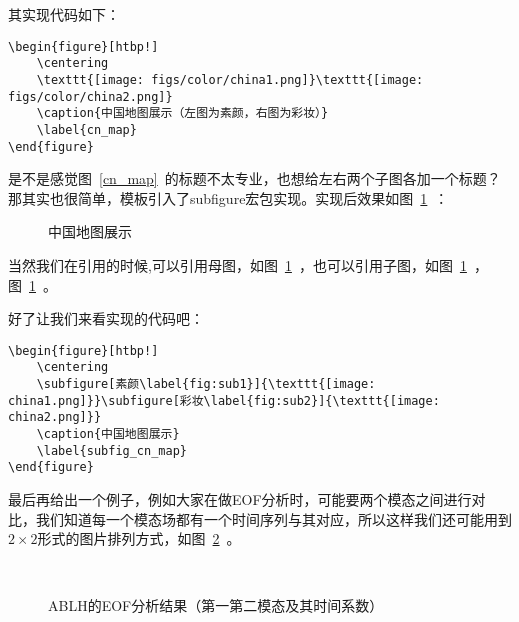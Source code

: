 其实现代码如下：

{
\color{green!50!black}
\begin{lstlisting}[breaklines=true,]
\begin{figure}[htbp!]
    \centering
    \texttt{[image: figs/color/china1.png]}\texttt{[image: figs/color/china2.png]}
    \caption{中国地图展示（左图为素颜，右图为彩妆）}
    \label{cn_map}
\end{figure}
\end{lstlisting}
}

是不是感觉图~\ref{cn_map}~的标题不太专业，也想给左右两个子图各加一个标题？那其实也很简单，模板引入了subfigure宏包实现。实现后效果如图~\ref{subfig_cn_map}~：

\begin{figure}[htbp!]
    \centering
    \caption{中国地图展示}
    \label{subfig_cn_map}
\end{figure}

当然我们在引用的时候,可以引用母图，如图~\ref{subfig_cn_map}~，也可以引用子图，如图~\ref{subfig_cn_map}~，图~\ref{subfig_cn_map}~。

好了让我们来看实现的代码吧：

{
\color{green!50!black}
\begin{lstlisting}[breaklines=true,]
\begin{figure}[htbp!]
    \centering
    \subfigure[素颜\label{fig:sub1}]{\texttt{[image: china1.png]}}\subfigure[彩妆\label{fig:sub2}]{\texttt{[image: china2.png]}}
    \caption{中国地图展示}
    \label{subfig_cn_map}
\end{figure}
\end{lstlisting}
}

最后再给出一个例子，例如大家在做EOF分析时，可能要两个模态之间进行对比，我们知道每一个模态场都有一个时间序列与其对应，所以这样我们还可能用到$2\times 2$形式的图片排列方式，如图~\ref{fig:eof_12}~。

\begin{figure}[htbp]
    \center
    \\
    \caption{ABLH的EOF分析结果（第一第二模态及其时间系数）}\label{fig:eof_12}
\end{figure}

